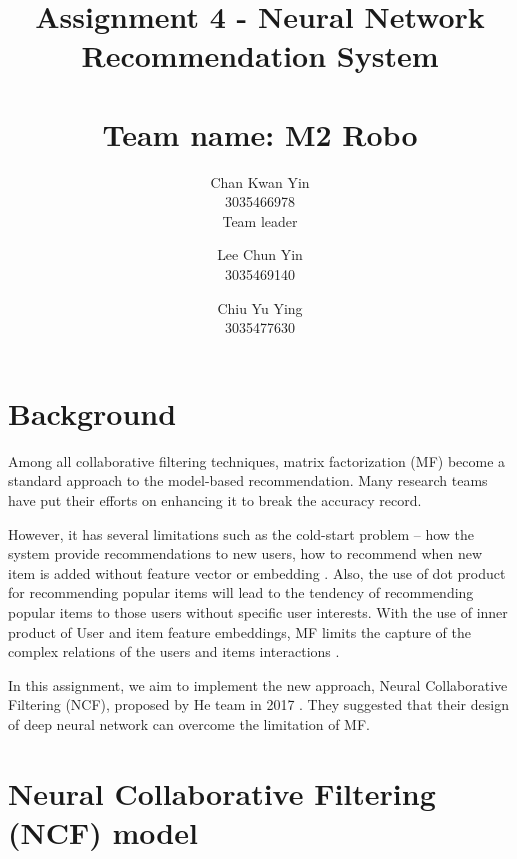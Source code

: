 \documentclass[final]{cvpr}
\begin{document}
\title{
	Assignment 4 - Neural Network Recommendation System \\~\\
	\large{Team name: M2 Robo}
}

\author{
	Chan Kwan Yin\\
	3035466978 \\
	Team leader

	\and

	Lee Chun Yin\\
	3035469140\\

	\and

	Chiu Yu Ying\\
	3035477630
}

\maketitle

\clearpage

\section{Background}

Among all collaborative filtering techniques, matrix factorization (MF) become a standard approach to the model-based recommendation. Many research teams have put their efforts on enhancing it to break the accuracy record. 

However, it has several limitations such as the cold-start problem -- how the system provide recommendations to new users, how to recommend when new item is added without feature vector or embedding \cite{FMF}. Also, the use of dot product for recommending popular items will lead to the tendency of recommending popular items to those users without specific user interests. With the use of inner product of User and item feature embeddings, MF limits the capture of the complex relations  of the users and items interactions \cite{he2017neural}.

In this assignment, we aim to implement the new approach, Neural Collaborative Filtering (NCF), proposed by He team in 2017 \cite{he2017neural}. They suggested that their design of deep neural network can overcome the limitation of MF.

\section{Neural Collaborative Filtering (NCF) model}
\end{document}
